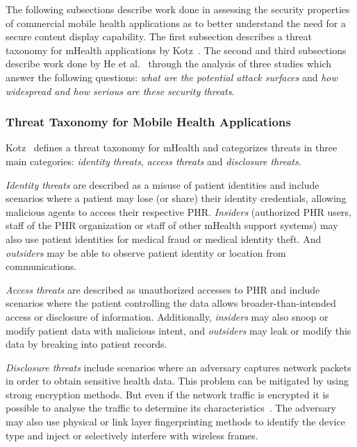 The following subsections describe work done in assessing the security properties of commercial mobile health applications as to better understand the need for a secure content display capability. The first subsection describes a threat taxonomy for mHealth applications by Kotz~\cite{kotz2011threat}. The second and third subsections describe work done by He et al.~\cite{he2014security} through the analysis of three studies which answer the following questions: \emph{what are the potential attack surfaces} and \emph{how widespread and how serious are these security threats}.

\subsubsection{Threat Taxonomy for Mobile Health Applications}

Kotz~\cite{kotz2011threat} defines a threat taxonomy for mHealth and categorizes threats in three main categories: \emph{identity threats}, \emph{access threats} and \emph{disclosure threats}.

\emph{Identity threats} are described as a misuse of patient identities and include scenarios where a patient may lose (or share) their identity credentials, allowing malicious agents to access their respective \ac{PHR}. \emph{Insiders} (authorized \ac{PHR} users, staff of the \ac{PHR} organization or staff of other mHealth support systems) may also use patient identities for medical fraud or medical identity theft. And \emph{outsiders} may be able to observe patient identity or location from communications.

\emph{Access threats} are described as unauthorized accesses to \ac{PHR} and include scenarios where the patient controlling the data allows broader-than-intended access or disclosure of information. Additionally, \emph{insiders} may also snoop or modify patient data with malicious intent, and \emph{outsiders} may leak or modify this data by breaking into patient records.

\emph{Disclosure threats} include scenarios where an adversary captures network packets in order to obtain sensitive health data. This problem can be mitigated by using strong encryption methods. But even if the network traffic is encrypted it is possible to analyse the traffic to determine its characteristics~\cite{wright2006inferring}. The adversary may also use physical or link layer fingerprinting methods to identify the device type and inject or selectively interfere with wireless frames.

